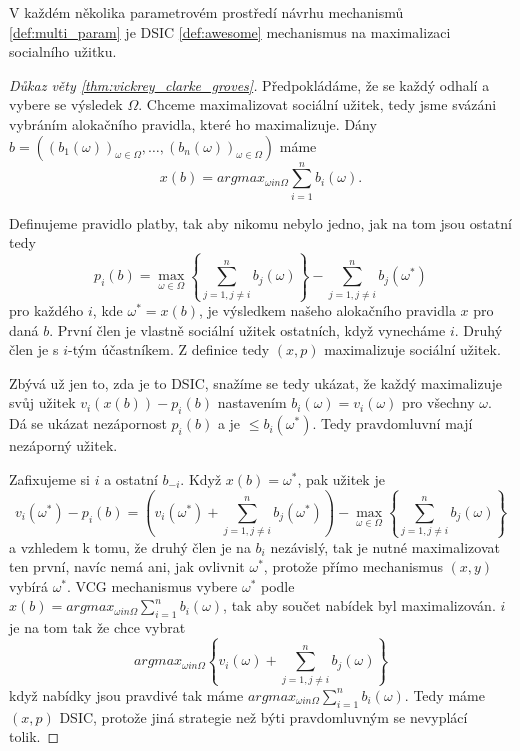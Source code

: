 \begin{theorem}
    \label{thm:vickrey_clarke_groves}
    V každém několika parametrovém prostředí návrhu mechanismů \ref{def:multi_param} je DSIC \ref{def:awesome} mechanismus na maximalizaci socialního užitku. 
\end{theorem} 
\begin{proof}[Důkaz věty \ref{thm:vickrey_clarke_groves}]
   Předpokládáme, že se každý odhalí a vybere se výsledek $\Omega$. 
   Chceme maximalizovat sociální užitek, tedy jsme svázáni vybráním alokačního pravidla, které ho maximalizuje. 
   Dány $b = ((b_1(\omega))_{\omega \in \Omega},\dots,(b_n(\omega))_{\omega \in \Omega})$ máme 
   \[
       x(b) = argmax_{\omega in \Omega}\sum^n_{i=1} b_i(\omega). 
   \]

   Definujeme pravidlo platby, tak aby nikomu nebylo jedno, jak na tom jsou ostatní tedy 
   \[
   p_i(b) = \max_{\omega \in \Omega} \left\{ \sum^n_{j=1, j\neq i} b_j(\omega) \right\} - \sum^n_{j=1, j\neq i} b_j(\omega^*)
   \]
   pro každého $i$, kde $\omega^* = x(b)$, je výsledkem našeho alokačního pravidla $x$ pro daná $b$. 
   První člen je vlastně sociální užitek ostatních, když vynecháme $i$. 
   Druhý člen je s $i$-tým účastníkem. 
   Z definice tedy $(x,p)$ maximalizuje sociální užitek. 
    
   Zbývá už jen to, zda je to DSIC, snažíme se tedy ukázat, že každý maximalizuje svůj užitek $v_i(x(b)) - p_i(b)$ nastavením $b_i(\omega) = v_i(\omega)$ pro všechny $\omega$. 
   Dá se ukázat nezápornost $p_i(b)$ a je $\leq b_i(\omega^*)$. 
   Tedy pravdomluvní mají nezáporný užitek. 

   Zafixujeme si $i$ a ostatní $b_{-i}$. 
   Když $x(b)= \omega^*$, pak užitek je 
   \[
    v_i(\omega^*) - p_i(b) = \left( v_i(\omega^*) + \sum^n_{j=1, j\neq i} b_j(\omega^*) \right) - \max_{\omega \in \Omega} \left\{ \sum^n_{j=1, j\neq i} b_j(\omega) \right\} 
   \]
   a vzhledem k tomu, že druhý člen je na $b_i$ nezávislý, tak je nutné maximalizovat ten první, navíc nemá ani, jak ovlivnit $\omega^*$, protože přímo mechanismus $(x,y)$ vybírá $\omega^*$. 
   VCG mechanismus vybere $\omega^*$ podle  $x(b) = argmax_{\omega in \Omega}\sum^n_{i=1} b_i(\omega)$, tak aby součet nabídek byl maximalizován. 
   $i$ je na tom tak že chce vybrat 
   \[
   argmax_{\omega in \Omega} \left\{ v_i(\omega) + \sum^n_{j=1, j\neq i} b_j(\omega) \right\}
   \]
   když nabídky jsou pravdivé tak máme $argmax_{\omega in \Omega}\sum^n_{i=1} b_i(\omega)$. 
   Tedy máme $(x,p)$ DSIC, protože jiná strategie než býti pravdomluvným se nevyplácí tolik. 
\end{proof}
